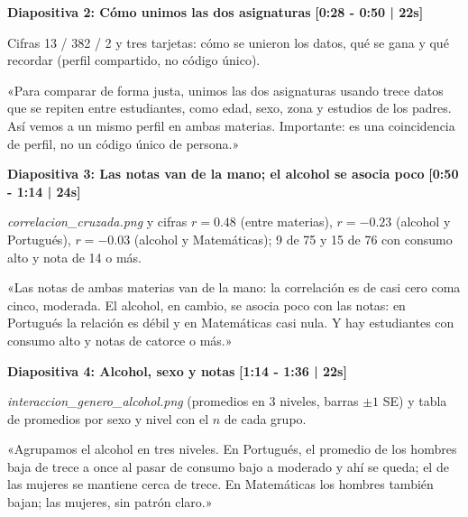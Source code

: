 \documentclass[11pt,a4paper]{article}
\begin{document}
\vspace{0.4cm}

\noindent
\textbf{\large Diapositiva 2: Cómo unimos las dos asignaturas} \hfill \textcolor{timeRed}{\textbf{[0:28 - 0:50 | 22s]}}
\begin{description}[noitemsep,topsep=2pt]
  \item[Visual en Pantalla:] Cifras 13 / 382 / 2 y tres tarjetas: cómo se unieron los datos, qué se gana y qué recordar (perfil compartido, no código único).
  \item[Guion de Voz (Speech):]
    «Para comparar de forma justa, unimos las dos asignaturas usando trece datos que se repiten entre estudiantes, como edad, sexo, zona y estudios de los padres. Así vemos a un mismo perfil en ambas materias. Importante: es una coincidencia de perfil, no un código único de persona.»
\end{description}

\vspace{0.4cm}

\noindent
\textbf{\large Diapositiva 3: Las notas van de la mano; el alcohol se asocia poco} \hfill \textcolor{timeRed}{\textbf{[0:50 - 1:14 | 24s]}}
\begin{description}[noitemsep,topsep=2pt]
  \item[Visual en Pantalla:] \textit{correlacion\_cruzada.png} y cifras $r=0.48$ (entre materias), $r=-0.23$ (alcohol y Portugués), $r=-0.03$ (alcohol y Matemáticas); 9 de 75 y 15 de 76 con consumo alto y nota de 14 o más.
  \item[Guion de Voz (Speech):]
    «Las notas de ambas materias van de la mano: la correlación es de casi cero coma cinco, moderada. El alcohol, en cambio, se asocia poco con las notas: en Portugués la relación es débil y en Matemáticas casi nula. Y hay estudiantes con consumo alto y notas de catorce o más.»
\end{description}

\vspace{0.4cm}

\noindent
\textbf{\large Diapositiva 4: Alcohol, sexo y notas} \hfill \textcolor{timeRed}{\textbf{[1:14 - 1:36 | 22s]}}
\begin{description}[noitemsep,topsep=2pt]
  \item[Visual en Pantalla:] \textit{interaccion\_genero\_alcohol.png} (promedios en 3 niveles, barras $\pm 1$ SE) y tabla de promedios por sexo y nivel con el $n$ de cada grupo.
  \item[Guion de Voz (Speech):]
    «Agrupamos el alcohol en tres niveles. En Portugués, el promedio de los hombres baja de trece a once al pasar de consumo bajo a moderado y ahí se queda; el de las mujeres se mantiene cerca de trece. En Matemáticas los hombres también bajan; las mujeres, sin patrón claro.»
\end{description}
\end{document}

